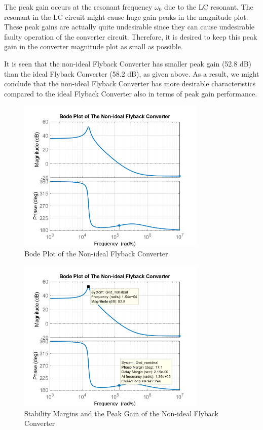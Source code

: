 The peak gain occurs at the resonant frequency $\omega_0$ due to the LC resonant. The resonant in the LC circuit might cause huge gain peaks in the magnitude plot. These peak gains are actually quite undesirable since they can cause undesirable faulty operation of the converter circuit. Therefore, it is desired to keep this peak gain in the converter magnitude plot as small as possible.

It is seen that the non-ideal Flyback Converter has smaller peak gain (52.8 dB) than the ideal Flyback Converter (58.2 dB), as given above. As a result, we might conclude that the non-ideal Flyback Converter has more desirable characteristics compared to the ideal Flyback Converter also in terms of peak gain performance.

\begin{figure}[H]
\begin{center}
\includegraphics[width=0.8\textwidth]{bode_plots/bode5.png}
\caption{Bode Plot of the Non-ideal Flyback Converter}
\label{com:bode5}
\end{center}
\end{figure}

\begin{figure}[H]
\begin{center}
\includegraphics[width=0.8\textwidth]{bode_plots/bode7.png}
\caption{Stability Margins and the Peak Gain of the Non-ideal Flyback Converter}
\label{com:bode7}
\end{center}
\end{figure}


